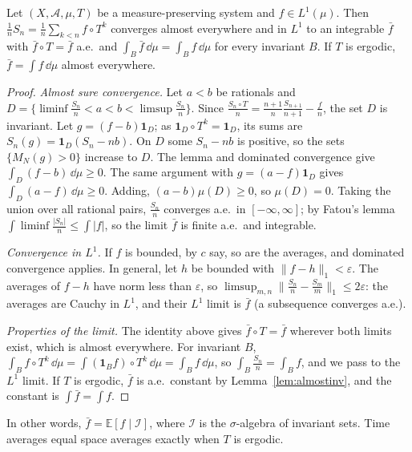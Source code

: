 \begin{theorem}\label{thm:birkhoff}
Let $(X,\mathcal A,\mu,T)$ be a measure-preserving system and $f\in L^1(\mu)$. Then $\frac1nS_n=\frac1n\sum_{k<n}f\circ T^k$ converges almost everywhere and in $L^1$ to an integrable $\bar f$ with $\bar f\circ T=\bar f$ a.e.\ and
$\int_B\bar f\,\dd\mu=\int_Bf\,\dd\mu$ for every invariant $B$. If $T$ is ergodic, $\bar f=\int f\,\dd\mu$ almost everywhere.
\end{theorem}
\begin{proof}
\emph{Almost sure convergence.} Let $a<b$ be rationals and $D=\{\liminf\frac{S_n}n<a<b<\limsup\frac{S_n}n\}$. Since $\frac{S_n\circ T}n=\frac{n+1}n\frac{S_{n+1}}{n+1}-\frac fn$, the set $D$ is invariant. Let
$g=(f-b)\mathbf 1_D$; as $\mathbf 1_D\circ T^k=\mathbf 1_D$, its sums are $S_n(g)=\mathbf 1_D(S_n-nb)$. On $D$ some $S_n-nb$ is positive, so the sets $\{M_N(g)>0\}$ increase to $D$. The lemma and dominated convergence
give $\int_D(f-b)\,\dd\mu\ge0$. The same argument with $g=(a-f)\mathbf 1_D$ gives $\int_D(a-f)\,\dd\mu\ge0$. Adding, $(a-b)\mu(D)\ge0$, so $\mu(D)=0$. Taking the union over all rational pairs, $\frac{S_n}n$ converges a.e.\ in $[-\infty,\infty]$; by
Fatou's lemma $\int\liminf\frac{|S_n|}n\le\int|f|$, so the limit $\bar f$ is finite a.e.\ and integrable.

\emph{Convergence in $L^1$.} If $f$ is bounded, by $c$ say, so are the averages, and dominated convergence applies. In general, let $h$ be bounded with $\|f-h\|_1<\varepsilon$. The averages of $f-h$ have norm less than
$\varepsilon$, so $\limsup_{m,n}\|\frac{S_n}n-\frac{S_m}m\|_1\le2\varepsilon$: the averages are Cauchy in $L^1$, and their $L^1$ limit is $\bar f$ (a subsequence converges a.e.).

\emph{Properties of the limit.} The identity above gives $\bar f\circ T=\bar f$ wherever both limits exist, which is almost everywhere. For invariant $B$, $\int_Bf\circ T^k\,\dd\mu=\int(\mathbf 1_Bf)\circ T^k\,\dd\mu=\int_Bf\,\dd\mu$, so
$\int_B\frac{S_n}n=\int_Bf$, and we pass to the $L^1$ limit. If $T$ is ergodic, $\bar f$ is a.e.\ constant by Lemma~\ref{lem:almostinv}, and the constant is $\int\bar f=\int f$.
\end{proof}

In other words, $\bar f=\mathbb E[f\mid\mathcal I]$, where $\mathcal I$ is the $\sigma$-algebra of invariant sets. Time averages equal space averages exactly when $T$ is ergodic.

